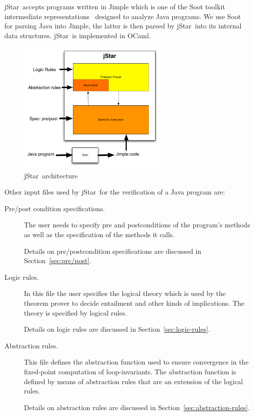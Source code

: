 \documentclass[11pt]{article}
\newcommand{\jStar}{{\sf jStar}}
\newcommand{\jStarPlain}{\jStar}
\begin{document}
\jStar \ accepts programs written in Jimple which is one of the Soot
toolkit intermediate representations~\cite{vall99soot} designed to
analyze Java programs. We use Soot for parsing Java into
Jimple, the latter is then parsed by \jStar \ into its internal data
structures. \jStar \ is implemented in OCaml.
%
\begin{figure}[t]
  \centering
  \includegraphics[width=2.9in]{architecture2}
  \caption[\jStarPlain\ architecture]{\jStar\ architecture}
  \label{fig:architecture}
\end{figure}
%
Other input files used by \jStar \ for the verification of a Java
program are:
\begin{description}
\item[Pre/post condition specifications.]  The user needs to specify
  pre and postconditions of the program's methods as well as the
  specification of the methods it calls. 

  Details on pre/postcondition specifications are discussed in
  Section~\ref{sec:pre/post}.
\item[Logic rules.]  In this file the user specifies the logical
  theory which is used by the theorem prover to decide entailment
  and other kinds of implications. The theory is specified by logical
  rules.  

  Details on logic rules are discussed in Section~\ref{sec:logic-rules}.
\item[Abstraction rules.]  This file defines the abstraction function
  used to ensure convergence in the fixed-point computation of
  loop-invariants. The abstraction function is defined by means of
  abstraction rules that are an extension of the logical rules. 
  
  Details on abstraction rules are discussed in
  Section~\ref{sec:abstraction-rules}.
\end{description}

\newcommand{\linkedlist}{\texttt{LinkedList.java} }
\end{document}
